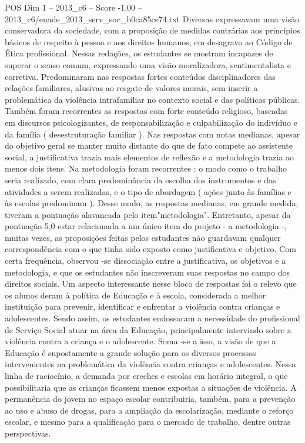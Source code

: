 \begin{textsample}{POS Dim 1 – 2013\_c6 – Score -1.00 – 2013\_c6/enade\_2013\_serv\_soc\_b0ca85ce74.txt}
Diversas expressavam uma visão conservadora da sociedade, com a proposição de medidas contrárias aos princípios básicos de respeito à pessoa e aos direitos humanos, em desagravo ao Código de Ética profissional.
Nessas redações, os estudantes se mostram incapazes de superar o senso comum, expressando uma visão moralizadora, sentimentalista e corretiva.
Predominaram nas respostas fortes conteúdos disciplinadores das relações familiares, alusivas ao resgate de valores morais, sem inserir a problemática da violência intrafamiliar no contexto social e das políticas públicas.
Também foram recorrentes as respostas com forte conteúdo religioso, baseadas em discursos psicologizantes, de responsabilização e culpabilização do indivíduo e da família ( desestruturação familiar ).
Nas respostas com notas medianas, apesar do objetivo geral se manter muito distante do que de fato compete ao assistente social, a justificativa trazia mais elementos de reflexão e a metodologia trazia ao menos dois itens.
Na metodologia foram recorrentes : o modo como o trabalho seria realizado, com clara predominância da escolha dos instrumentos e das atividades a serem realizadas, e o tipo de abordagem ( ações junto às famílias e às escolas predominam ).
Desse modo, as respostas medianas, em grande medida, tiveram a pontuação alavancada pelo item"metodologia".
Entretanto, apesar da pontuação 5,0 estar relacionada a um único item do projeto - a metodologia -, muitas vezes, as proposições feitas pelos estudantes não guardavam qualquer correspondência com o que tinha sido exposto como justificativa e objetivo.
Com certa frequência, observou -se dissociação entre a justificativa, os objetivos e a metodologia, e que os estudantes não inscreveram suas respostas no campo dos direitos sociais.
Um aspecto interessante nesse bloco de respostas foi o relevo que os alunos deram à política de Educação e à escola, considerada a melhor instituição para prevenir, identificar e enfrentar a violência contra crianças e adolescentes.
Sendo assim, os estudantes endossaram a necessidade do profissional de Serviço Social atuar na área da Educação, principalmente intervindo sobre a violência contra a criança e o adolescente.
Soma -se a isso, a visão de que a Educação é supostamente a grande solução para os diversos processos intervenientes na problemática da violência contra crianças e adolescentes.
Nessa linha de raciocínio, a demanda por creches e escolas em horário integral, o que possibilitaria que as crianças ficassem menos expostas a situações de violência.
A permanência do jovem no espaço escolar contribuiria, também, para a prevenção ao uso e abuso de drogas, para a ampliação da escolarização, mediante o reforço escolar, e mesmo para a qualificação para o mercado de trabalho, dentre outras perspectivas.

\end{textsample}
